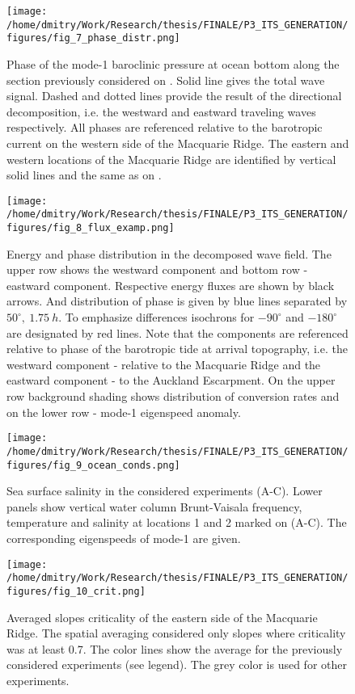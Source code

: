 \documentclass[12pt]{article}
\newcommand{\SCALEO}{2}
\newcommand{\SCALET}{1.25}
\begin{document}
\begin{figure}
	\centering
	\texttt{[image: /home/dmitry/Work/Research/thesis/FINALE/P3\_ITS\_GENERATION/figures/fig\_7\_phase\_distr.png]}
	\caption{Phase of the mode-1 baroclinic pressure at ocean bottom along the section 
	previously 
	considered on . Solid line gives the total wave signal. Dashed and dotted 
	lines provide the result of the directional decomposition, i.e. the westward and eastward 
	traveling waves	respectively. All phases are referenced relative to the barotropic current on 
	the western side of the Macquarie Ridge. The eastern and western locations of the Macquarie 
	Ridge are identified by vertical solid lines and the same as on .}
\label{C3.fig:2d_phase}
\end{figure}

\begin{figure}
	\centering
	\texttt{[image: /home/dmitry/Work/Research/thesis/FINALE/P3\_ITS\_GENERATION/figures/fig\_8\_flux\_examp.png]}
	\caption{Energy and phase distribution in the decomposed wave field. The upper row shows the 
	westward component and bottom row - eastward component. Respective energy fluxes are shown by 
	black arrows. And distribution of phase is given by blue lines separated by 
	$50^{\circ},~1.75~h$. To emphasize differences isochrons for $-90^{\circ}$ and $-180^{\circ}$ 
	are 
	designated by red lines. Note that the components are referenced relative to phase of the 
	barotropic tide at arrival topography, i.e. the westward component  - relative to the 
	Macquarie Ridge and the eastward component - to the Auckland Escarpment. On the upper row 
	background shading shows distribution of conversion rates and on the lower row - mode-1 
	eigenspeed anomaly.}
	\label{C3.fig:wv_fld_dist}
\end{figure}

\begin{figure}
	\centering
	\texttt{[image: /home/dmitry/Work/Research/thesis/FINALE/P3\_ITS\_GENERATION/figures/fig\_9\_ocean\_conds.png]}
	\caption{Sea surface salinity in the considered experiments (A-C). Lower panels show 
	vertical water column Brunt-Vaisala frequency, temperature and salinity at locations 1 and 2 
	marked on (A-C). The corresponding eigenspeeds of mode-1 are given.}
	\label{C3.fig:ocean_cond}
\end{figure}

\begin{figure}
	\centering
	\texttt{[image: /home/dmitry/Work/Research/thesis/FINALE/P3\_ITS\_GENERATION/figures/fig\_10\_crit.png]}
	\caption{Averaged slopes criticality of the eastern side of the Macquarie Ridge. The spatial 
	averaging considered only slopes where criticality was at least 0.7. The color lines show 
	the average for the previously considered experiments (see legend). The grey color is used for 
	other experiments.}
	\label{C3.fig:crit}
\end{figure}
\end{document}
